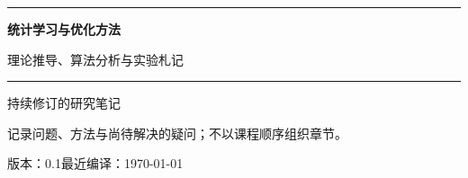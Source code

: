 \begin{titlepage}
\thispagestyle{empty}
\vspace*{39mm}
{\color{accent}\rule{31mm}{1.4pt}}\par
\vspace{14mm}
{\sffamily\bfseries\fontsize{29pt}{39pt}\selectfont 统计学习与优化方法\par}
\vspace{5mm}
{\sffamily\fontsize{15pt}{23pt}\selectfont 理论推导、算法分析与实验札记\par}
\vspace{20mm}
{\color{accent}\rule{\textwidth}{0.45pt}}\par
\vspace{8mm}
{\large 持续修订的研究笔记}\par
\vspace{4mm}
{\normalsize 记录问题、方法与尚待解决的疑问；不以课程顺序组织章节。}\par
\vfill
{\small 版本：0.1\quad\textbar\quad 最近编译：\today}\par
\vspace{17mm}
\end{titlepage}
